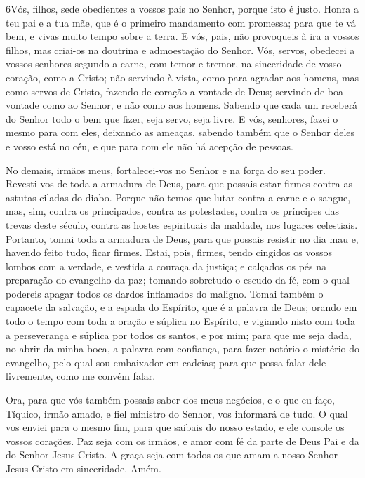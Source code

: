 \medskip

\lettrine{6} Vós, filhos, sede obedientes a vossos pais no
Senhor, porque isto é justo. Honra a teu pai e a tua mãe, que é
o primeiro mandamento com promessa; para que te vá bem, e vivas
muito tempo sobre a terra. E vós, pais, não provoqueis à ira a
vossos filhos, mas criai-os na doutrina e admoestação do Senhor.
Vós, servos, obedecei a vossos senhores segundo a carne, com
temor e tremor, na sinceridade de vosso coração, como a Cristo;
não servindo à vista, como para agradar aos homens, mas como
servos de Cristo, fazendo de coração a vontade de Deus; servindo
de boa vontade como ao Senhor, e não como aos homens. Sabendo
que cada um receberá do Senhor todo o bem que fizer, seja servo,
seja livre. E vós, senhores, fazei o mesmo para com eles,
deixando as ameaças, sabendo também que o Senhor deles e vosso está
no céu, e que para com ele não há acepção de pessoas.

No demais, irmãos meus, fortalecei-vos no Senhor e na força do
seu poder. Revesti-vos de toda a armadura de Deus, para que
possais estar firmes contra as astutas ciladas do diabo.
Porque não temos que lutar contra a carne e o sangue, mas,
sim, contra os principados, contra as potestades, contra os
príncipes das trevas deste século, contra as hostes espirituais da
maldade, nos lugares celestiais. Portanto, tomai toda a
armadura de Deus, para que possais resistir no dia mau e, havendo
feito tudo, ficar firmes. Estai, pois, firmes, tendo cingidos
os vossos lombos com a verdade, e vestida a couraça da justiça;
e calçados os pés na preparação do evangelho da paz;
tomando sobretudo o escudo da fé, com o qual podereis apagar
todos os dardos inflamados do maligno. Tomai também o
capacete da salvação, e a espada do Espírito, que é a palavra de
Deus; orando em todo o tempo com toda a oração e súplica no
Espírito, e vigiando nisto com toda a perseverança e súplica por
todos os santos, e por mim; para que me seja dada, no abrir
da minha boca, a palavra com confiança, para fazer notório o
mistério do evangelho, pelo qual sou embaixador em cadeias;
para que possa falar dele livremente, como me convém falar.

Ora, para que vós também possais saber dos meus negócios, e o que
eu faço, Tíquico, irmão amado, e fiel ministro do Senhor, vos
informará de tudo. O qual vos enviei para o mesmo fim, para
que saibais do nosso estado, e ele console os vossos corações.
Paz seja com os irmãos, e amor com fé da parte de Deus Pai e
da do Senhor Jesus Cristo. A graça seja com todos os que amam
a nosso Senhor Jesus Cristo em sinceridade. Amém.

